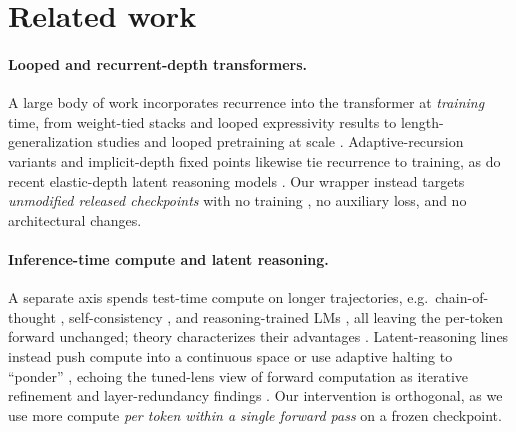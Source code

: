 \section{Related work}
\label{sec:related}

\paragraph{Looped and recurrent-depth transformers.}
A large body of work incorporates recurrence into the transformer at \emph{training} time, from weight-tied stacks \citep{dehghani2019universal,lan2020albert} and looped expressivity results \citep{liu2024looped,xu2025expressive,merrill2025little,gong2025whatmakes, YangLNP24, GeipingYS25} to length-generalization studies \citep{yang2025looped,deluca2024simulation,schwarzschild2021canyou,bansal2022endtoend} and looped pretraining at scale \citep{geiping2025scaling,zhu2025ouro,prairie2026parcae,tang2026looprpt,wu2025parallel}. Adaptive-recursion variants \citep{gao2024algoformer,csordas2024moeut,bae2025mor,bae2024relaxed,nouriborji2025modernalbert} and implicit-depth fixed points \citep{bai2019deep,bai2020multiscale} likewise tie recurrence to training, as do recent elastic-depth latent reasoning models \citep{jeddi2026loopformer,oncescu2026recurrent,chen2026thinking,knupp2026depth,yu2026spiralformer,pappone2025twoscale,koishekenov2025encode}. Our wrapper instead targets \emph{unmodified released checkpoints} \citep{qwen3,llama3,deepseekv2,moonlight} with no training \citep{LiangLCL24, liu2024distributed, liang2024cautious, nguyen2024memory, chen2025demystifying, chen2025cautious, NguyenLCL26}, no auxiliary loss, and no architectural changes.

\paragraph{Inference-time compute and latent reasoning.}
A separate axis spends test-time compute on longer trajectories, e.g.\ chain-of-thought \citep{wei2022chain, MohtashamiPJ25}, self-consistency \citep{wang2023selfconsistency}, and reasoning-trained LMs \citep{deepseek2025r1}, all leaving the per-token forward unchanged; theory characterizes their advantages \citep{feng2023revealing,merrill2024expressive,xu2025tocot,saunshi2025reasoning}. Latent-reasoning lines instead push compute into a continuous space \citep{hao2024coconut,cheng2024compressed,pfau2024letsthink,goyal2024think,zeng2025ponder,yu2025relay,geiping2025scaling, li2026learning} or use adaptive halting to ``ponder'' \citep{graves2016adaptive,banino2021pondernet,kohli2026loop,lu2025latentcot,liang2026latentcot,chen2026loopbridge}, echoing the tuned-lens view of forward computation as iterative refinement \citep{belrose2023eliciting} and layer-redundancy findings \citep{men2024short,lad2024remarkable,takase2021lessons,reid2021subformer}. Our intervention is orthogonal, as we use more compute \emph{per token within a single forward pass} on a frozen checkpoint.

